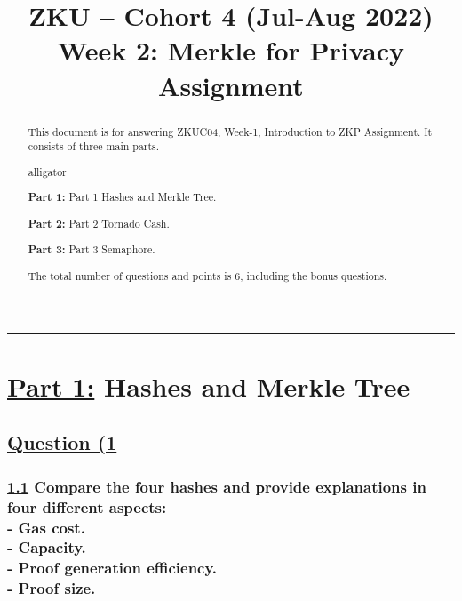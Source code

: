 \documentclass[letterpaper, 10 pt, conference]{ieeeconf}  %
\title{\LARGE \bf
ZKU – Cohort 4 (Jul-Aug 2022)\\Week 2: Merkle for Privacy\\Assignment \sharp 2}
\author{Iskander Andrews$^{1}$%
\thanks{\faIcon[regular]{envelope} \tt\small iskander.s.andrews@gmail.com}
\thanks{\faIcon{discord} \tt\small Isk#0996}
\thanks{\faIcon{github} \tt\small iskdrews}}
\begin{document}
\maketitle
\thispagestyle{empty}
\pagestyle{empty}


\begin{abstract}

This document is for answering ZKUC04, Week-1, Introduction to ZKP Assignment.
It consists of three main parts.
\begin{labeling}{alligator}
\item [\textbf{Part 1:}] Part 1 Hashes and Merkle Tree.
\item [\textbf{Part 2:}] Part 2 Tornado Cash.
\item [\textbf{Part 3:}] Part 3 Semaphore.
\end{labeling}

The total number of questions and points is $6$, including the bonus questions. 
\end{abstract}

\noindent\rule{8cm}{0.4pt}

\section{\textbf{\underline{Part 1:}} Hashes and Merkle Tree}
\subsection{\textbf{\underline{Question (1}}}
\subsubsection{\textbf{\underline{1.1} Compare the four hashes and provide explanations in four different aspects: \\ 
- Gas cost. \\ 
- Capacity.\\ 
- Proof generation efficiency.\\
- Proof size.}}

\end{document}
